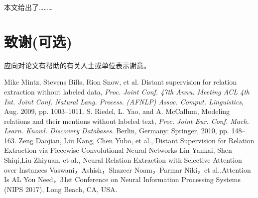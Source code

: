 \documentclass[UTF8]{csoarticle}
\begin{document}
本文给出了………

\section*{致谢(可选)}

应向对论文有帮助的有关人士或单位表示谢意。



\begin{thebibliography}{15} %
     Mike Mintz, Stevens Bills, Rion Snow, et al. Distant supervision for relation extraction without labeled data, \textit{Proc. Joint Conf. 47th Annu. Meeting ACL 4th Int. Joint Conf. Natural Lang. Process. (AFNLP) Assoc. Comput. Linguistics}, Aug. 2009, pp. 1003–1011.
     S. Riedel, L. Yao, and A. McCallum, Modeling relations and their mentions without labeled text, \textit{Proc. Joint Eur. Conf. Mach. Learn. Knowl. Discovery Databases.} Berlin, Germany: Springer, 2010, pp. 148–163.
     Zeng Daojian, Liu Kang, Chen Yubo, et al., Distant Supervision for Relation Extraction via Piecewise Convolutional Neural Networks
     Lin Yankai, Shen Shiqi,Liu Zhiyuan, et al., Neural Relation Extraction with Selective Attention over Instances
     Vaswani，Ashish，Shazeer Noam，Parmar Niki，et al.,Attention Is AL You Need，31st Conference on Neural Information Processing Systems (NIPS 2017), Long Beach, CA, USA.
\end{thebibliography}
\end{document}

